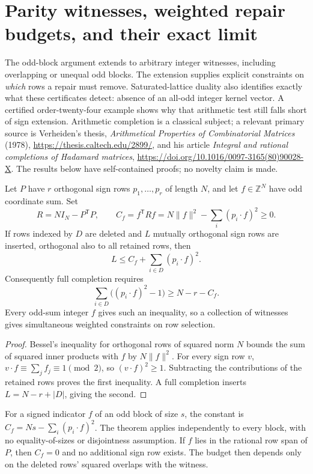 \section{Parity witnesses, weighted repair budgets, and their exact limit}
\label{sec:parity-repair}

The odd-block argument extends to arbitrary integer witnesses, including
overlapping or unequal odd blocks. The extension supplies explicit
constraints on \emph{which} rows a repair must remove. Saturated-lattice
duality also identifies exactly what these certificates detect: absence
of an all-odd integer kernel vector. A certified order-twenty-four
example shows why that arithmetic test still falls short of sign
extension. Arithmetic completion is a classical subject; a relevant
primary source is Verheiden's thesis,
\emph{Arithmetical Properties of Combinatorial Matrices} (1978),
\url{https://thesis.caltech.edu/2899/}, and his article
\emph{Integral and rational completions of Hadamard matrices},
\url{https://doi.org/10.1016/0097-3165(80)90028-X}.
The results below have self-contained proofs; no novelty claim is made.

\begin{theorem}
Let $P$ have $r$ orthogonal sign rows $p_1,\ldots,p_r$ of length $N$,
and let $f\in\mathbb Z^N$ have odd coordinate sum. Set
\[
 R=NI_N-P^{\mathsf T}P,\qquad
 C_f=f^{\mathsf T}Rf
     =N\|f\|^2-\sum_i(p_i\cdot f)^2\ge0.
\]
If rows indexed by $D$ are deleted and $L$ mutually orthogonal sign
rows are inserted, orthogonal also to all retained rows, then
\[
 L\le C_f+\sum_{i\in D}(p_i\cdot f)^2.
\]
Consequently full completion requires
\[
 \sum_{i\in D}\bigl((p_i\cdot f)^2-1\bigr)
       \ge N-r-C_f.
\]
Every odd-sum integer $f$ gives such an inequality, so a collection
of witnesses gives simultaneous weighted constraints on row selection.
\end{theorem}
\begin{proof}
Bessel's inequality for orthogonal rows of squared norm $N$ bounds
the sum of squared inner products with $f$ by $N\|f\|^2$.
For every sign row $v$, $v\cdot f\equiv\sum_j f_j\equiv1\pmod2$,
so $(v\cdot f)^2\ge1$. Subtracting the contributions of the retained
rows proves the first inequality. A full completion inserts
$L=N-r+|D|$, giving the second.
\end{proof}

For a signed indicator $f$ of an odd block of size $s$, the constant
is $C_f=Ns-\sum_i(p_i\cdot f)^2$. The theorem applies independently
to every block, with no equality-of-sizes or disjointness assumption.
If $f$ lies in the rational row span of $P$, then $C_f=0$ and no
additional sign row exists. The budget then depends only on the
deleted rows' squared overlaps with the witness.

